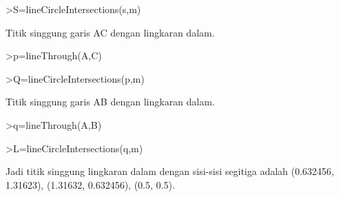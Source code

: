 \documentclass[12pt,arial,letterpaper]{book}
\begin{document}
\begin{eulernootebook}
\begin{eulercomment}
\begin{eulercomment}
\begin{eulernootebook}
\begin{eulercomment}
\begin{eulercomment}
\begin{eulercomment}
\begin{eulercomment}
\begin{eulercomment}
\begin{eulercomment}
\begin{eulernotebook}
\begin{eulercomment}
\begin{eulercomment}
\begin{eulerprompt}
>S=lineCircleIntersections(s,m)
\end{eulerprompt}
\begin{euleroutput}
  [0.632456,  1.31623]
\end{euleroutput}
\begin{eulercomment}
Titik singgung garis AC dengan lingkaran dalam.
\end{eulercomment}
\begin{eulerprompt}
>p=lineThrough(A,C)
\end{eulerprompt}
\begin{euleroutput}
  [-2,  1,  -2]
\end{euleroutput}
\begin{eulerprompt}
>Q=lineCircleIntersections(p,m)
\end{eulerprompt}
\begin{euleroutput}
  [1.31623,  0.632456]
\end{euleroutput}
\begin{eulercomment}
Titik singgung garis AB dengan lingkaran dalam.
\end{eulercomment}
\begin{eulerprompt}
>q=lineThrough(A,B)
\end{eulerprompt}
\begin{euleroutput}
  [-1,  -1,  -1]
\end{euleroutput}
\begin{eulerprompt}
>L=lineCircleIntersections(q,m)
\end{eulerprompt}
\begin{euleroutput}
  [0.5,  0.5]
\end{euleroutput}
\begin{eulercomment}
Jadi titik singgung lingkaran dalam dengan sisi-sisi segitiga adalah
(0.632456, 1.31623), (1.31632, 0.632456), (0.5, 0.5).


\end{eulercomment}
\end{eulercomment}
\end{eulercomment}
\end{eulernotebook}
\end{eulercomment}
\end{eulercomment}
\end{eulercomment}
\end{eulercomment}
\end{eulercomment}
\end{eulercomment}
\end{eulernootebook}
\end{eulercomment}
\end{eulercomment}
\end{eulernootebook}
\end{document}
